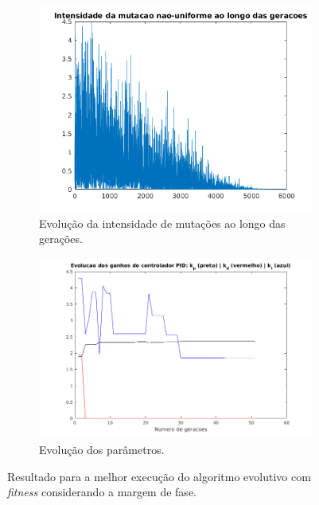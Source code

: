 \begin {enumerate}
\begin{figure}[h!]
		\begin{subfigure}{.5\textwidth}
		  \centering
		  \includegraphics[width=1\linewidth]{image/melhor_fitness_pid_ex_d_5}
		  \caption{\centering Evolução da intensidade de mutações ao longo das
		  gerações.}
		  \label{fig:pid_mutacao_d_5}
		\end{subfigure}%
		\begin{subfigure}{.5\textwidth}
		  \centering
		  \includegraphics[width=1\linewidth]{image/kp_kd_ki_pid_ex_d_5}
		  \caption{\centering Evolução dos parâmetros.}
		  \label{fig:pid_parametros_d_5} 
		\end{subfigure}
	
	\caption{Resultado para a melhor execução do algoritmo evolutivo com
	\textit{fitness} considerando a margem de fase.}
	\end{figure}
	

\end{enumerate}
